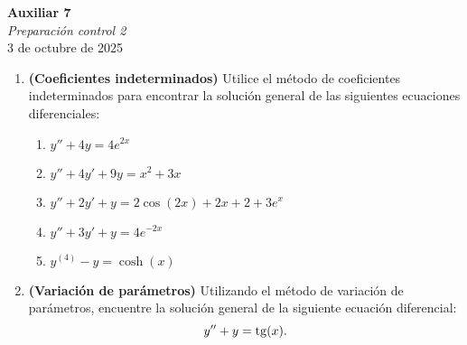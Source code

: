 \documentclass{article}
\begin{document}


\begin{center}
    \Huge{\textbf{Auxiliar 7}}\\
\textit{\large{Preparación control 2}}\\
    \normalsize
    3 de octubre de 2025
\end{center}

\begin{enumerate}
	\item \textbf{(Coeficientes indeterminados)} Utilice el método de coeficientes indeterminados para encontrar la solución general de las siguientes ecuaciones diferenciales:
		\begin{enumerate}
			\item $y'' + 4y = 4 e^{2x}$
			\item $y'' + 4y' + 9y = x^2 + 3x$
			\item $y'' + 2y' + y = 2\cos(2x) + 2x + 2 + 3 e^{x}$
			\item $y'' + 3y' + y = 4 e^{-2x}$
			\item $y^{(4)} - y = \cosh(x)$
		\end{enumerate}
	\item \textbf{(Variación de parámetros)} Utilizando el método de variación de parámetros, encuentre la solución general de la siguiente ecuación diferencial:
$$
	y'' + y = \operatorname{tg}(x).
$$

\end{enumerate}
\end{document}
